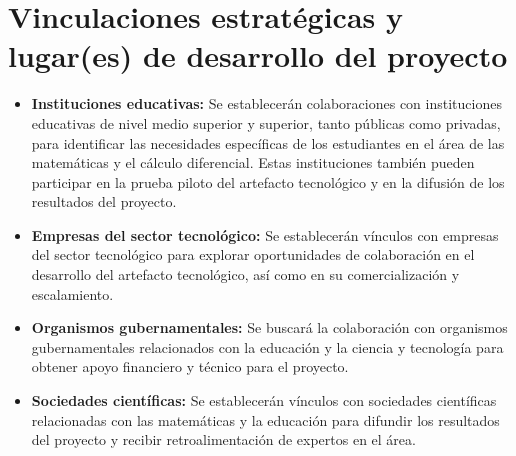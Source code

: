 \documentclass{article}
\begin{document}
\section{Vinculaciones estratégicas y lugar(es) de desarrollo del proyecto}
\begin{itemize}
  \item \textbf{Instituciones educativas:} Se establecerán colaboraciones con instituciones educativas de nivel medio superior y superior, tanto públicas como privadas, para identificar las necesidades específicas de los estudiantes en el área de las matemáticas y el cálculo diferencial. Estas instituciones también pueden participar en la prueba piloto del artefacto tecnológico y en la difusión de los resultados del proyecto.
  \item \textbf{Empresas del sector tecnológico:} Se establecerán vínculos con empresas del sector tecnológico para explorar oportunidades de colaboración en el desarrollo del artefacto tecnológico, así como en su comercialización y escalamiento.
  \item \textbf{Organismos gubernamentales:} Se buscará la colaboración con organismos gubernamentales relacionados con la educación y la ciencia y tecnología para obtener apoyo financiero y técnico para el proyecto.
  \item \textbf{Sociedades científicas:} Se establecerán vínculos con sociedades científicas relacionadas con las matemáticas y la educación para difundir los resultados del proyecto y recibir retroalimentación de expertos en el área.
\end{itemize}
\end{document}
